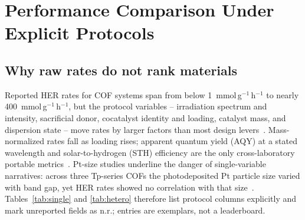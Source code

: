 \section{Performance Comparison Under Explicit Protocols}
\label{sec:performance}

\subsection{Why raw rates do not rank materials}

Reported HER rates for COF systems span from below
1~mmol\,g$^{-1}$\,h$^{-1}$ to nearly 400~mmol\,g$^{-1}$\,h$^{-1}$, but the
protocol variables -- irradiation spectrum and intensity, sacrificial donor,
cocatalyst identity and loading, catalyst mass, and dispersion state -- move
rates by larger factors than most design levers~\cite{zhong2023oligo,
zhao2024nanoscale,ghosh2020identification}. Mass-normalized rates fall as
loading rises; apparent quantum yield (AQY) at a stated wavelength and
solar-to-hydrogen (STH) efficiency are the only cross-laboratory portable
metrics~\cite{luo2024asymmetric,cheng2023fully}. Pt-size studies underline
the danger of single-variable narratives: across three Tp-series COFs the
photodeposited Pt particle size varied with band gap, yet HER rates showed
no correlation with that size~\cite{wang2026bandgap}. Tables~\ref{tab:single}
and \ref{tab:hetero} therefore list protocol columns explicitly and mark
unreported fields as n.r.; entries are exemplars, not a leaderboard.

